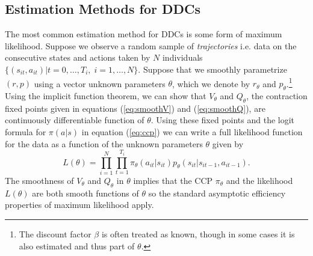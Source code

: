 \subsection{Estimation Methods for DDCs}
\label{section:ddc_methods}

The most common estimation method for DDCs is some form of  maximum likelihood.
Suppose we observe a random sample of {\it trajectories\/} i.e. data on the  consecutive states and actions taken by
 $N$  individuals $\{(s_{it},a_{it})|t=0,\ldots,T_i, \; i=1,\ldots,N\}$. Suppose  
that we smoothly parametrize $(r,p)$ using a vector unknown parameters $\theta$, which we denote by
$r_\theta$ and $p_\theta$.\footnote{\footnotesize
The discount factor  $\beta$ is often treated as known, though in 
some cases it is also estimated and thus part of $\theta$.}  
Using the implicit function theorem, we can show that $V_\theta$ and $Q_\theta$, the contraction fixed points given in equations
(\ref{eq:smoothV}) and (\ref{eq:smoothQ}), are continuously differentiable function of $\theta$.
Using these fixed points and the logit formula for $\pi(a|s)$ in equation (\ref{eq:ccp}) we can  write a full  likelihood
function for the data as a function of the unknown parameters $\theta$ given by
\begin{equation}
    L(\theta) = \prod_{i=1}^N \prod_{t=1}^{T_i}  \pi_\theta(a_{it}|s_{it})p_\theta(s_{it}|s_{it-1},a_{it-1}).
\label{eq:lf}
\end{equation}
The smoothness of $V_\theta$ and $Q_\theta$ in $\theta$ implies that the CCP $\pi_\theta$ and the
likelihood $L(\theta)$ are both smooth functions of $\theta$ so the standard asymptotic
efficiency properties of maximum likelihood apply. 


